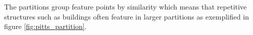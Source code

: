 \documentclass[12pt,journal]{IEEEtran}
\begin{document}
The partitions group feature points by similarity which means that 
repetitive structures such as buildings often feature in larger 
partitions as exemplified in figure \ref{fig:pitts_partition}.
%
%		
%
\end{document}
